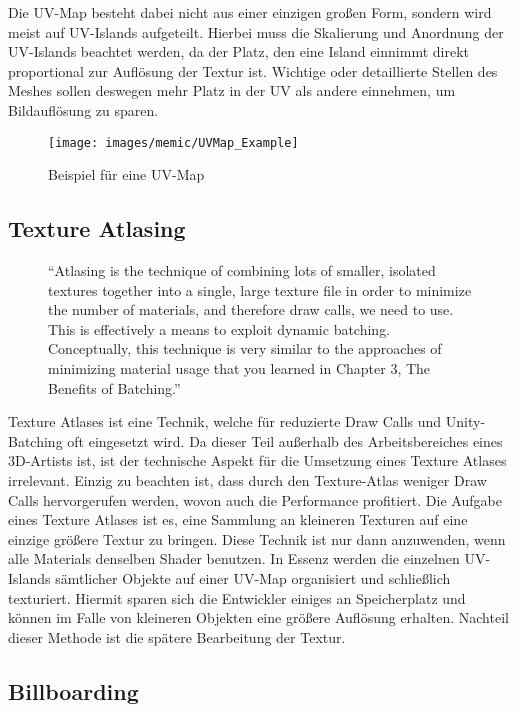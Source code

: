 Die UV-Map besteht dabei nicht aus einer einzigen großen Form, sondern wird meist auf UV-Islands aufgeteilt. Hierbei muss die Skalierung und Anordnung der UV-Islands beachtet werden, da der Platz, den eine Island einnimmt direkt proportional zur Auflösung der Textur ist. Wichtige oder detaillierte Stellen des Meshes sollen deswegen mehr Platz in der UV als andere einnehmen, um Bildauflösung zu sparen.\cite[S.18]{_3d_modeling_pipline}

\begin{figure}[H]
	\centering
	\texttt{[image: images/memic/UVMap\_Example]}
	\caption{Beispiel für eine UV-Map}
\end{figure}

\subsection{Texture Atlasing}

\begin{figure}[H]
	\centering
"`Atlasing is the technique of combining lots of smaller, isolated textures together into a single, large texture file in order to minimize the number of materials, and therefore draw calls, we need to use. This is effectively a means to exploit dynamic batching. Conceptually, this technique is very similar to the approaches of minimizing material usage that you learned in Chapter 3, The Benefits of Batching."'\cite[S.145]{_unity_game_optimization}
\end{figure}


Texture Atlases ist eine Technik, welche für reduzierte Draw Calls und Unity-Batching oft eingesetzt wird. Da dieser Teil außerhalb des Arbeitsbereiches eines 3D-Artists ist, ist der technische Aspekt für die Umsetzung eines Texture Atlases irrelevant. Einzig zu beachten ist, dass durch den Texture-Atlas weniger Draw Calls hervorgerufen werden, wovon auch die Performance profitiert.
Die Aufgabe eines Texture Atlases ist es, eine Sammlung an kleineren Texturen auf eine einzige größere Textur zu bringen. Diese Technik ist nur dann anzuwenden, wenn alle Materials denselben Shader benutzen. In Essenz werden die einzelnen UV-Islands sämtlicher Objekte auf einer UV-Map organisiert und schließlich texturiert. Hiermit sparen sich die Entwickler einiges an Speicherplatz und können im Falle von kleineren Objekten eine größere Auflösung erhalten. Nachteil dieser Methode ist die spätere Bearbeitung der Textur.\cite[S.146]{_unity_game_optimization}

\subsection{Billboarding}

